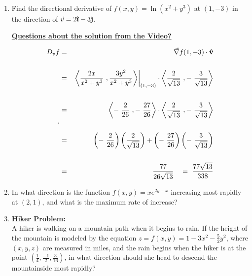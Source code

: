 \begin{enumerate}[{Example} 1: ]
\item Find the directional derivative of \(f(x,y)=\ln(x^2+y^3)\) at \((1,-3)\) in the direction of \(\vec{v} = 2\ihat-3\jhat\).\\

\hspace*{-.25in}%

\underline{\textbf{Questions about the solution from the Video? }}

\begin{eqnarray*}
D_v f &=& \grad f(1,-3) \cdot \boldsymbol{\hat{\textbf{v}}}\\~\\
&=& \left. \<\frac{2x}{x^2+y^3}\ , \frac{3y^2}{x^2+y^3}\>\right|_{(1,-3)} \cdot \< \frac{2}{\sqrt{13}}\ ,-\ \frac{3}{\sqrt{13}}\>\\~\\
&=& \< -\ \frac{2}{26}\ , -\ \frac{27}{26}\> \cdot \< \frac{2}{\sqrt{13}}\ ,-\ \frac{3}{\sqrt{13}}\>\\`\\
&=& \left(-\ \frac{2}{26}\right)\left(\frac{2}{\sqrt{13}}\right) + \left(-\ \frac{27}{26} \right) \left( -\ \frac{3}{\sqrt{13}}\right)\\~\\
&=& \frac{77}{26\sqrt{13}} \ \ \ = \ \frac{77\sqrt{13}}{338}
\end{eqnarray*}



\vspace*{.2in}

\item In what direction is the function \(f(x,y) = x e^{2y-x}\) increasing most rapidly at \((2,1)\), and what is the maximum rate of increase?
\vfill

\item \textbf{Hiker Problem:}\\
A hiker is walking on a mountain path when it begins to rain.  If the height of the mountain is modeled by the equation \(z= f(x,y)=1-3x^2-\frac{5}{2}y^2\), where \((x,y,z)\) are measured in miles, and the rain begins when the hiker is at the point \(\left(\frac{1}{4},\frac{-1}{2},\frac{3}{16}\right)\), in what direction should she head to descend the mountainside most rapidly?\\


\end{enumerate}
